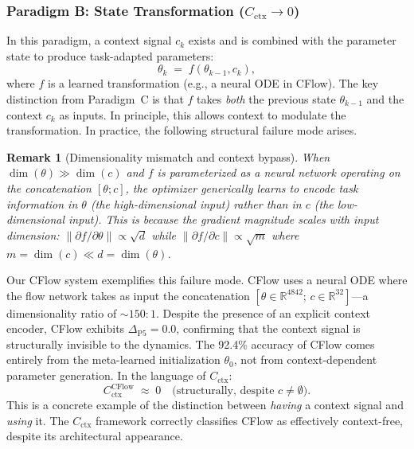 \documentclass{article}
\newtheorem{remark}{Remark}
\begin{document}
\subsubsection{Paradigm B: State Transformation ($C_\mathrm{ctx} \to 0$)}
\label{sec:paradigm_b}

In this paradigm, a context signal $c_k$ exists and is combined with the parameter state to produce task-adapted parameters:
\begin{equation}
    \theta_k \;=\; f(\theta_{k-1}, c_k),
\end{equation}
where $f$ is a learned transformation (e.g., a neural ODE in CFlow). The key distinction from Paradigm~C is that $f$ takes \emph{both} the previous state $\theta_{k-1}$ and the context $c_k$ as inputs. In principle, this allows context to modulate the transformation. In practice, the following structural failure mode arises.

\begin{remark}[Dimensionality mismatch and context bypass]
\label{rmk:bypass}
When $\dim(\theta) \gg \dim(c)$ and $f$ is parameterized as a neural network operating on the concatenation $[\theta; c]$, the optimizer generically learns to encode task information in $\theta$ (the high-dimensional input) rather than in $c$ (the low-dimensional input). This is because the gradient magnitude scales with input dimension: $\|\partial f / \partial \theta\| \propto \sqrt{d}$ while $\|\partial f / \partial c\| \propto \sqrt{m}$ where $m = \dim(c) \ll d = \dim(\theta)$.
\end{remark}

Our CFlow system exemplifies this failure mode. CFlow uses a neural ODE where the flow network takes as input the concatenation $[\theta \in \mathbb{R}^{4842};\, c \in \mathbb{R}^{32}]$---a dimensionality ratio of $\sim\!150{:}1$. Despite the presence of an explicit context encoder, CFlow exhibits $\Delta_\mathrm{P5} = 0.0$, confirming that the context signal is structurally invisible to the dynamics. The 92.4\% accuracy of CFlow comes entirely from the meta-learned initialization $\theta_0$, not from context-dependent parameter generation. In the language of $C_\mathrm{ctx}$:
\begin{equation}
    C_\mathrm{ctx}^\mathrm{CFlow} \;\approx\; 0 \quad \text{(structurally, despite } c \neq \emptyset \text{)}.
\end{equation}
This is a concrete example of the distinction between \emph{having} a context signal and \emph{using} it. The $C_\mathrm{ctx}$ framework correctly classifies CFlow as effectively context-free, despite its architectural appearance.
\end{document}
